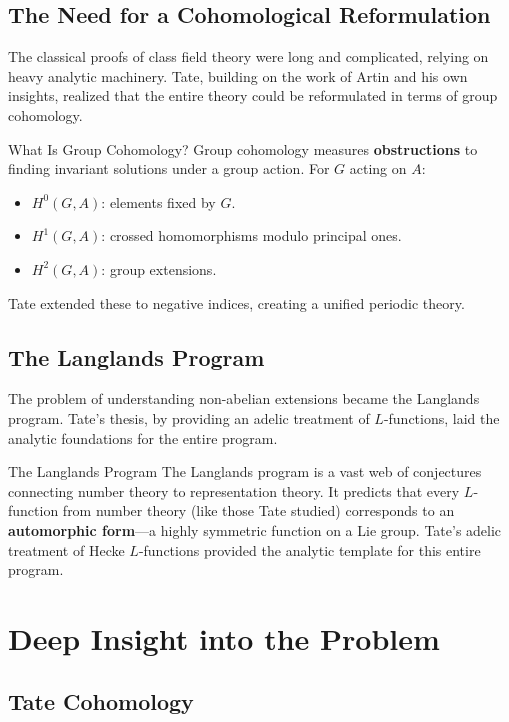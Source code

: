 \subsection{The Need for a Cohomological Reformulation}

The classical proofs of class field theory were long and complicated, relying on heavy analytic machinery. Tate, building on the work of Artin and his own insights, realized that the entire theory could be reformulated in terms of group cohomology.

\begin{primer}{What Is Group Cohomology?}
Group cohomology measures \textbf{obstructions} to finding invariant solutions under a group action. For $G$ acting on $A$:
\begin{itemize}
\item $H^0(G,A)$: elements fixed by $G$.
\item $H^1(G,A)$: crossed homomorphisms modulo principal ones.
\item $H^2(G,A)$: group extensions.
\end{itemize}
Tate extended these to negative indices, creating a unified periodic theory.
\end{primer}

\subsection{The Langlands Program}

The problem of understanding non-abelian extensions became the Langlands program. Tate's thesis, by providing an adelic treatment of $L$-functions, laid the analytic foundations for the entire program.

\begin{knowledgebridge}{The Langlands Program}
The Langlands program is a vast web of conjectures connecting number theory to representation theory. It predicts that every $L$-function from number theory (like those Tate studied) corresponds to an \textbf{automorphic form}---a highly symmetric function on a Lie group. Tate's adelic treatment of Hecke $L$-functions provided the analytic template for this entire program.
\end{knowledgebridge}

\section{Deep Insight into the Problem}

\subsection{Tate Cohomology}

